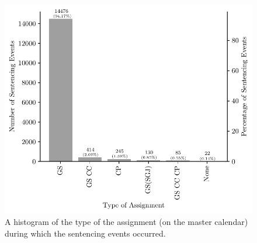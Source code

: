 \documentclass[11pt, oneside]{article}   	%
\theoremstyle{ModifiedStyle}
\begin{document}
	\begin{figure}[H]
		\centering
		\includegraphics[scale=0.75]{Figures/Type_of_Court_Assignment_Sentencing_Event_Histogram}
		\caption{A histogram of the type of the assignment (on the master calendar) during which the sentencing events occurred.}
		\label{Figure_Assignment_Type_Sentencing_Event_Histogram}
	\end{figure}
\end{document}

